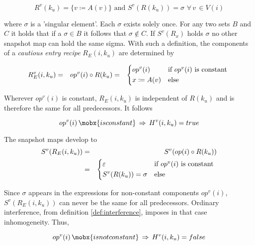 \documentclass[12pt,a4paper]{scrartcl}
\begin{document}
\begin{equation} \label{eq:undetermined-recipe}
    R^v(k_u) = \{ v \coloneqq A(v) \} \,\,\mbox{and}\,\, S^v(R(k_u)) = \sigma\,\,\forall\,v\,\in V(i)
\end{equation}

where $\sigma$ is a 'singular element'. Each $\sigma$ exists solely once. For
any two sets $B$ and $C$ it holds that if a $\sigma \in B$ it follows that
$\sigma \notin C$.  If $S^v(R_x)$ holds $\sigma$ no other snapshot map can hold
the same sigma.  With such a definition, the components of a \textit{cautious
entry recipe} $R_E(i,k_u)$ are determined by

\begin{eqnarray}
    R^v_E(i,k_u) & = & op^v(i) \circ R(k_u)
                 & = & \begin{dcases*}
                       op^v(i)         & if $op^v(i)$ is constant \\
                       x \coloneq A(v) & else
                       \end{dcases*}
\end{eqnarray}

Wherever $op^v(i)$ is constant, $R_E(i,k_u)$ is independent of $R(k_u)$ and is
therefore the same for all predecessors. It follows

\begin{equation} \label{eq:cautious-recipe-homogeneity}
    op^v(i) \,\mobx{is constant}\,\Rightarrow\,H^v(i, k_u) = true
\end{equation}

The snapshot maps develop to
\begin{eqnarray} \label{eq:cautious-repl-1}
    S^v(R_E(i,k_u)) & = & S^v(op(i) \circ R(k_u)) \\ 
                    & = & \begin{dcases*}
                          \varepsilon          & if $op^v(i)$ is constant \\
                          S^v(R(k_u)) = \sigma & else
                          \end{dcases*}
\end{eqnarray}

Since $\sigma$ appears in the expressions for non-constant components
$op^v(i)$, $S^v(R_E(i,k_u))$ can never be the same for all predecessors. Ordinary
interference, from definition \ref{def:interference}, imposes in that case
inhomogeneity. Thus,

\begin{equation} \label{eq:cautious-recipe-inhomogeneity}
    op^v(i) \,\mobx{is not constant}\,\Rightarrow\,H^v(i, k_u) = false
\end{equation}
\end{document}
